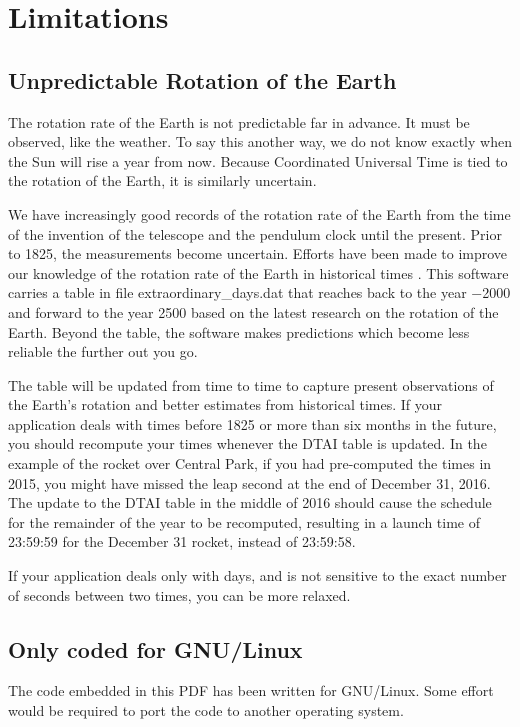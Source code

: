 \documentclass[letterpaper,twoside]{article}
\newcommand{\filename}{\ttfamily\smaller}
\begin{document}
\section{Limitations}
\subsection{Unpredictable Rotation of the Earth}
The rotation rate of the Earth is not predictable far in advance.  It must
be observed, like the weather.  To say this another way, we do not know
exactly when the Sun will rise a year from now.  Because Coordinated
Universal Time is tied to the rotation of the Earth, it is similarly
uncertain.

We have increasingly good records of the rotation rate of the Earth
from the time
of the invention of the telescope and the pendulum clock until
the present.  Prior to \num{1825}, the measurements become uncertain.
Efforts have been made to improve our knowledge of the rotation
rate of the Earth in historical times\citep{2004JHA....35..327M}%
\citep{2005JHA....36..339M}\citep{1997A&A...322..347S}%
\citep{2011ASSP...23....3S}\citep{1986PEPI...44..281M}%
\citep{Stephenson20160404}\citep{Stephenson20210217}.
This software carries a table in file {\filename extraordinary\_days.dat}
that reaches back to the year \num{-2000} and forward to
the year \num{2500} based on the latest research on the rotation
of the Earth.
Beyond the table, the software makes predictions which become less
reliable the further out you go.

The table will be updated from time to time to capture present
observations of the Earth's rotation and better estimates from
historical times.  If your application deals with times before
\num{1825} or more than six months in the future, you should recompute
your times whenever the DTAI table is updated.  In the example
of the rocket over Central Park, if you had pre-computed the times
in 2015, you might have missed the leap second at the end of
December 31, 2016.  The update to the DTAI table in the middle
of 2016 should cause the schedule for the remainder of the year
to be recomputed, resulting in a launch time of 23:59:59 for
the December 31 rocket, instead of 23:59:58.

If your application deals only with days, and is not sensitive
to the exact number of seconds between two times, you can be
more relaxed.

\subsection{Only coded for GNU/Linux}
The code embedded in this PDF has been written for GNU/Linux.
Some effort would be required to port the code to another
operating system.
\end{document}
